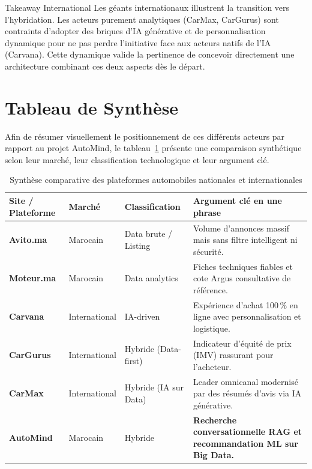 \documentclass[11pt,a4paper]{article}
\begin{document}
\begin{insightbox}{Takeaway International}
Les géants internationaux illustrent la transition vers l'hybridation. Les acteurs purement analytiques (CarMax, CarGurus) sont contraints d'adopter des briques d'IA générative et de personnalisation dynamique pour ne pas perdre l'initiative face aux acteurs natifs de l'IA (Carvana). Cette dynamique valide la pertinence de concevoir directement une architecture combinant ces deux aspects dès le départ.
\end{insightbox}

\newpage

\section{Tableau de Synthèse}

Afin de résumer visuellement le positionnement de ces différents acteurs par rapport au projet AutoMind, le tableau~\ref{tab:synthese} présente une comparaison synthétique selon leur marché, leur classification technologique et leur argument clé.

\begin{table}[htbp]
  \centering
  \caption{Synthèse comparative des plateformes automobiles nationales et internationales}
  \label{tab:synthese}
  \vspace{0.3cm}
  \begin{tabular}{llp{3cm}p{6.5cm}}
    \toprule
    \textbf{Site / Plateforme} & \textbf{Marché} & \textbf{Classification} & \textbf{Argument clé en une phrase} \\
    \midrule
    \textbf{Avito.ma} & Marocain & Data brute / Listing & Volume d'annonces massif mais sans filtre intelligent ni sécurité. \\
    \addlinespace
    \textbf{Moteur.ma} & Marocain & Data analytics & Fiches techniques fiables et cote Argus consultative de référence. \\
    \addlinespace
    \textbf{Carvana} & International & IA-driven & Expérience d'achat 100\,\% en ligne avec personnalisation et logistique. \\
    \addlinespace
    \textbf{CarGurus} & International & Hybride (Data-first) & Indicateur d'équité de prix (IMV) rassurant pour l'acheteur. \\
    \addlinespace
    \textbf{CarMax} & International & Hybride (IA sur Data) & Leader omnicanal modernisé par des résumés d'avis via IA générative. \\
    \addlinespace
    \midrule
    \textbf{AutoMind} & Marocain & Hybride & \textbf{Recherche conversationnelle RAG et recommandation ML sur Big Data.} \\
    \bottomrule
  \end{tabular}
\end{table}
\end{document}
